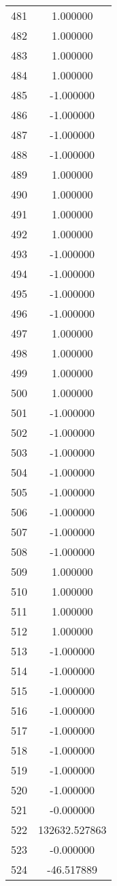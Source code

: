 \documentclass[12pt]{article}
\begin{document}
\begin{longtable}{@{}cc@{}}
481 & 1.000000 \\
482 & 1.000000 \\
483 & 1.000000 \\
484 & 1.000000 \\
485 & -1.000000 \\
486 & -1.000000 \\
487 & -1.000000 \\
488 & -1.000000 \\
489 & 1.000000 \\
490 & 1.000000 \\
491 & 1.000000 \\
492 & 1.000000 \\
493 & -1.000000 \\
494 & -1.000000 \\
495 & -1.000000 \\
496 & -1.000000 \\
497 & 1.000000 \\
498 & 1.000000 \\
499 & 1.000000 \\
500 & 1.000000 \\
501 & -1.000000 \\
502 & -1.000000 \\
503 & -1.000000 \\
504 & -1.000000 \\
505 & -1.000000 \\
506 & -1.000000 \\
507 & -1.000000 \\
508 & -1.000000 \\
509 & 1.000000 \\
510 & 1.000000 \\
511 & 1.000000 \\
512 & 1.000000 \\
513 & -1.000000 \\
514 & -1.000000 \\
515 & -1.000000 \\
516 & -1.000000 \\
517 & -1.000000 \\
518 & -1.000000 \\
519 & -1.000000 \\
520 & -1.000000 \\
521 & -0.000000 \\
522 & 132632.527863 \\
523 & -0.000000 \\
524 & -46.517889 \\

\end{longtable}
\end{document}
